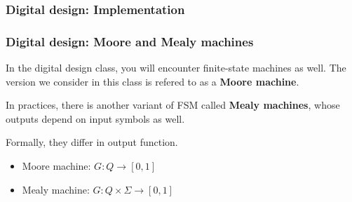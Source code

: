 \begin{frame}
  \frametitle{Digital design: Implementation}

\end{frame}

\begin{frame}
  \frametitle{Digital design: Moore and Mealy machines}

  In the digital design class, you will encounter finite-state
  machines as well.  The version we consider in this class is refered
  to as a {\bf Moore machine}.

  In practices, there is another variant of FSM called {\bf Mealy
    machines}, whose outputs depend on input symbols as well.

  \pause

  Formally, they differ in output function.

  \begin{itemize}
  \item Moore machine: $G:Q \longrightarrow [0,1]$
  \item Mealy machine: $G:Q\times \Sigma \longrightarrow [0,1]$
  \end{itemize}
  
\end{frame}
